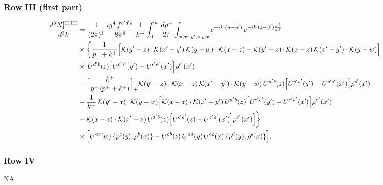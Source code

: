 \documentclass[9pt]{article}
\numberwithin{equation}{section}
\begin{document}
\subsubsection*{Row III (first part)}
\begin{align}
\frac{d^{3}N^{\rm III.III}_{1}}{d^{3}k} & =\frac{1}{(2\pi)^{3}}\,\frac{ig^{4}\,f^{c'd'a}}{8\pi^{4}}\,\frac{1}{k^{+}}\int_{0}^{\infty}\frac{dp^{+}}{2\pi}\int_{w,x',y',z,y,x}e^{-ik\cdot(w-y')}\,e^{-ik\cdot(z-y')\frac{p^{+}}{k^{+}}}\notag\\
&\times\bigg\{\frac{1}{p^{+}+k^{+}}\Big[\mathcal{K}(y'-z)\cdot\mathcal{K}(x'-y')\,\mathcal{K}(y-w)\cdot\mathcal{K}(x-z)-\mathcal{K}(y'-z)\cdot\mathcal{K}(x-z)\,\mathcal{K}(x'-y')\cdot\mathcal{K}(y-w)\Big]\notag\\
&\times\,U^{d'b}(z)\Big[U^{c'e'}(y')-U^{c'e'}(x')\Big]\rho^{e'}(x')\notag\\
&-\Big[\frac{k^{+}}{p^{+}\,(p^{+}+k^{+})}\Big]_{+}\mathcal{K}(y'-z)\cdot\mathcal{K}(x-z)\,\mathcal{K}(x'-y')\cdot\mathcal{K}(y-w)\,U^{d'b}(z)\Big[U^{c'e'}(y')-U^{c'e'}(x')\Big]\rho^{e'}(x')\notag\\
&-\frac{1}{k^{+}}\,\mathcal{K}(y'-z)\cdot\mathcal{K}(y-w)\Big[\mathcal{K}(x-z)\cdot\mathcal{K}(x'-y')\,U^{d'b}(z)\Big[U^{c'e'}(y')-U^{c'e'}(x')\Big]\rho^{e'}(x')\notag\\
&-\mathcal{K}(x-z)\cdot\mathcal{K}(x'-z)\,U^{d'b}(z)\Big[U^{c'e'}(z)-U^{c'e'}(x')\Big]\rho^{e'}(x')\Big]\bigg\}\notag\\
&\times \Big[U^{ac}(w)\,\{\rho^{c}(y),\rho^{b}(x)\}-U^{cb}(z)\,U^{ad}(y)\,U^{ce}(x)\,\{\rho^{d}(y),\rho^{e}(x)\}\Big].\label{eq:B-III3one}
\end{align}
\subsubsection*{Row IV} \textsc{NA}
\end{document}
